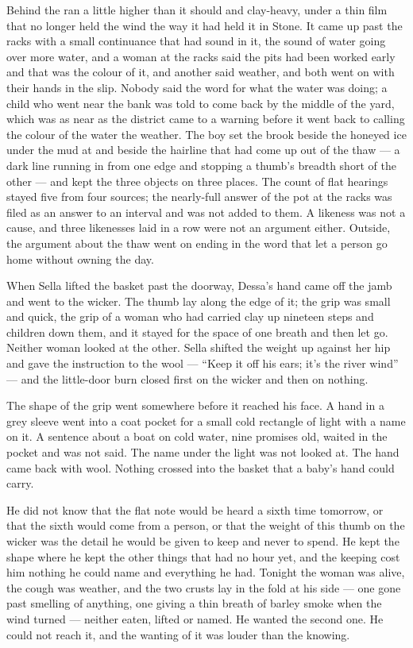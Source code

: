 Behind  the  ran a little higher than it should and clay-heavy, under a thin film that no longer held the wind the way it had held it in Stone. It came up past the racks with a small continuance that had sound in it, the sound of water going over more water, and a woman at the racks said the pits had been worked early and that was the colour of it, and another said weather, and both went on with their hands in the slip. Nobody said the word for what the water was doing; a child who went near the bank was told to come back by the middle of the yard, which was as near as the district came to a warning before it went back to calling the colour of the water the weather. The boy set the brook beside the honeyed ice under the mud at  and beside the hairline that had come up out of the thaw --- a dark line running in from one edge and stopping a thumb's breadth short of the other --- and kept the three objects on three places. The count of flat hearings stayed five from four sources; the nearly-full answer of the pot at the racks was filed as an answer to an interval and was not added to them. A likeness was not a cause, and three likenesses laid in a row were not an argument either. Outside, the argument about the thaw went on ending in the word that let a person go home without owning the day.

\scenebreak

When Sella lifted the basket past the doorway, Dessa's hand came off the jamb and went to the wicker. The thumb lay along the edge of it; the grip was small and quick, the grip of a woman who had carried clay up nineteen steps and children down them, and it stayed for the space of one breath and then let go. Neither woman looked at the other. Sella shifted the weight up against her hip and gave the instruction to the wool --- “Keep it off his ears; it's the river wind” --- and the little-door burn closed first on the wicker and then on nothing.

The shape of the grip went somewhere before it reached his face. A hand in a grey sleeve went into a coat pocket for a small cold rectangle of light with a name on it. A sentence about a boat on cold water, nine promises old, waited in the pocket and was not said. The name under the light was not looked at. The hand came back with wool. Nothing crossed into the basket that a baby's hand could carry.

He did not know that the flat note would be heard a sixth time tomorrow, or that the sixth would come from a person, or that the weight of this thumb on the wicker was the detail he would be given to keep and never to spend. He kept the shape where he kept the other things that had no hour yet, and the keeping cost him nothing he could name and everything he had. Tonight the woman was alive, the cough was weather, and the two crusts lay in the fold at his side --- one gone past smelling of anything, one giving a thin breath of barley smoke when the wind turned --- neither eaten, lifted or named. He wanted the second one. He could not reach it, and the wanting of it was louder than the knowing.


